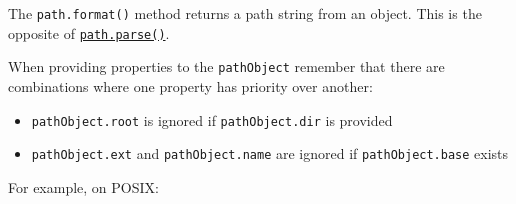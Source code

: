 The \texttt{path.format()} method returns a path string from an object.
This is the opposite of \hyperref[pathparsepath]{\texttt{path.parse()}}.

When providing properties to the \texttt{pathObject} remember that there
are combinations where one property has priority over another:

\begin{itemize}
\tightlist
\item
  \texttt{pathObject.root} is ignored if \texttt{pathObject.dir} is
  provided
\item
  \texttt{pathObject.ext} and \texttt{pathObject.name} are ignored if
  \texttt{pathObject.base} exists
\end{itemize}

For example, on POSIX:

\begin{Shaded}
\begin{Highlighting}[]
\NormalTok{(\{}
  \OperatorTok{:} \OperatorTok{,}
  \OperatorTok{:} \OperatorTok{,}
  \OperatorTok{:} \OperatorTok{,}
\NormalTok{\})}\OperatorTok{;}

\NormalTok{(\{}
  \OperatorTok{:} \StringTok{\textquotesingle{}/\textquotesingle{}}\OperatorTok{,}
  \OperatorTok{:} \OperatorTok{,}
  \OperatorTok{:} \OperatorTok{,}
\NormalTok{\})}\OperatorTok{;}


\end{Highlighting}
\end{Shaded}
